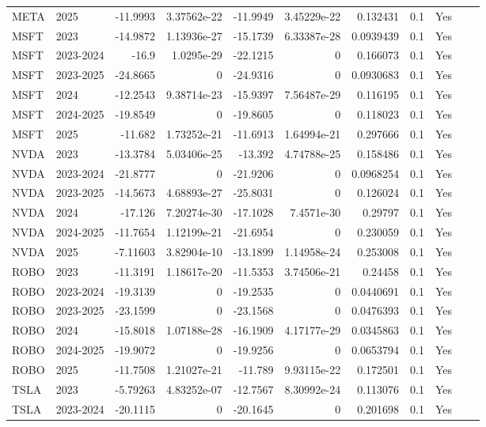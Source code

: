 \begin{longtable}{llrrrrrrrrl}
META & 2025 & -11.9993 & 3.37562e-22 & -11.9949 & 3.45229e-22 & 0.132431 & 0.1 & Yes &  \\
MSFT & 2023 & -14.9872 & 1.13936e-27 & -15.1739 & 6.33387e-28 & 0.0939439 & 0.1 & Yes &  \\
MSFT & 2023-2024 & -16.9 & 1.0295e-29 & -22.1215 & 0 & 0.166073 & 0.1 & Yes &  \\
MSFT & 2023-2025 & -24.8665 & 0 & -24.9316 & 0 & 0.0930683 & 0.1 & Yes &  \\
MSFT & 2024 & -12.2543 & 9.38714e-23 & -15.9397 & 7.56487e-29 & 0.116195 & 0.1 & Yes &  \\
MSFT & 2024-2025 & -19.8549 & 0 & -19.8605 & 0 & 0.118023 & 0.1 & Yes &  \\
MSFT & 2025 & -11.682 & 1.73252e-21 & -11.6913 & 1.64994e-21 & 0.297666 & 0.1 & Yes &  \\
NVDA & 2023 & -13.3784 & 5.03406e-25 & -13.392 & 4.74788e-25 & 0.158486 & 0.1 & Yes &  \\
NVDA & 2023-2024 & -21.8777 & 0 & -21.9206 & 0 & 0.0968254 & 0.1 & Yes &  \\
NVDA & 2023-2025 & -14.5673 & 4.68893e-27 & -25.8031 & 0 & 0.126024 & 0.1 & Yes &  \\
NVDA & 2024 & -17.126 & 7.20274e-30 & -17.1028 & 7.4571e-30 & 0.29797 & 0.1 & Yes &  \\
NVDA & 2024-2025 & -11.7654 & 1.12199e-21 & -21.6954 & 0 & 0.230059 & 0.1 & Yes &  \\
NVDA & 2025 & -7.11603 & 3.82904e-10 & -13.1899 & 1.14958e-24 & 0.253008 & 0.1 & Yes &  \\
ROBO & 2023 & -11.3191 & 1.18617e-20 & -11.5353 & 3.74506e-21 & 0.24458 & 0.1 & Yes &  \\
ROBO & 2023-2024 & -19.3139 & 0 & -19.2535 & 0 & 0.0440691 & 0.1 & Yes &  \\
ROBO & 2023-2025 & -23.1599 & 0 & -23.1568 & 0 & 0.0476393 & 0.1 & Yes &  \\
ROBO & 2024 & -15.8018 & 1.07188e-28 & -16.1909 & 4.17177e-29 & 0.0345863 & 0.1 & Yes &  \\
ROBO & 2024-2025 & -19.9072 & 0 & -19.9256 & 0 & 0.0653794 & 0.1 & Yes &  \\
ROBO & 2025 & -11.7508 & 1.21027e-21 & -11.789 & 9.93115e-22 & 0.172501 & 0.1 & Yes &  \\
TSLA & 2023 & -5.79263 & 4.83252e-07 & -12.7567 & 8.30992e-24 & 0.113076 & 0.1 & Yes &  \\
TSLA & 2023-2024 & -20.1115 & 0 & -20.1645 & 0 & 0.201698 & 0.1 & Yes &  \\

\end{longtable}
